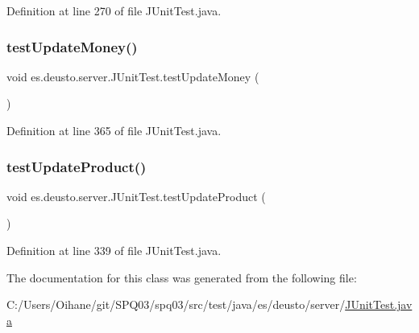 Definition at line 270 of file J\+Unit\+Test.\+java.

\mbox{\label{classes_1_1deusto_1_1server_1_1_j_unit_test_aaad8cae59ca19f9dba654a12f695dbd0}} 
\subsubsection{\texorpdfstring{test\+Update\+Money()}{testUpdateMoney()}}
{\footnotesize\ttfamily void es.\+deusto.\+server.\+J\+Unit\+Test.\+test\+Update\+Money (\begin{DoxyParamCaption}{ }\end{DoxyParamCaption})}



Definition at line 365 of file J\+Unit\+Test.\+java.

\mbox{\label{classes_1_1deusto_1_1server_1_1_j_unit_test_a6af88e3e3ad84aed02c23286c5d2a178}} 
\subsubsection{\texorpdfstring{test\+Update\+Product()}{testUpdateProduct()}}
{\footnotesize\ttfamily void es.\+deusto.\+server.\+J\+Unit\+Test.\+test\+Update\+Product (\begin{DoxyParamCaption}{ }\end{DoxyParamCaption})}



Definition at line 339 of file J\+Unit\+Test.\+java.



The documentation for this class was generated from the following file\+:\begin{DoxyCompactItemize}
\item 
C\+:/\+Users/\+Oihane/git/\+S\+P\+Q03/spq03/src/test/java/es/deusto/server/\hyperlink{_j_unit_test_8java}{J\+Unit\+Test.\+java}\end{DoxyCompactItemize}
